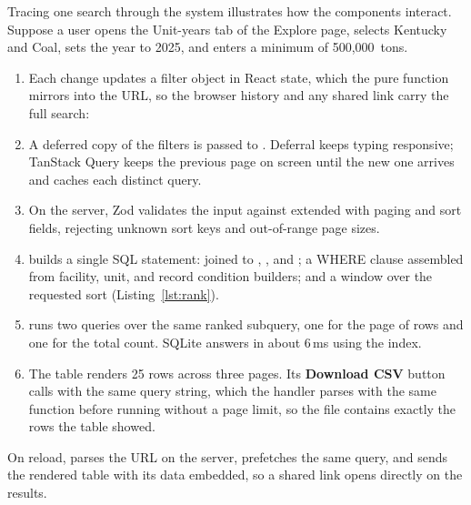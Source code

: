 \documentclass[11pt,a4paper]{article}
\begin{document}
Tracing one search through the system illustrates how the components interact. Suppose a user
opens the Unit-years tab of the Explore page, selects Kentucky and Coal, sets the year to 2025, and enters a minimum
\COtwo{} of 500{,}000~tons.

\begin{enumerate}
  \item Each change updates a filter object in React state, which the pure function
         mirrors into the URL, so the browser history and any shared
        link carry the full search:\\[2pt]
        {\small{}}
  \item A deferred copy of the filters is passed to .
        Deferral keeps typing responsive; TanStack Query keeps the previous page on screen
        until the new one arrives and caches each distinct query.
  \item On the server, Zod validates the input against  extended
        with paging and sort fields, rejecting unknown sort keys and out-of-range page sizes.
  \item {} builds a single SQL statement:  joined to
        , , and ; a WHERE clause assembled from
        facility, unit, and record condition builders; and a  window over
        the requested sort (Listing~\ref{lst:rank}).
  \item {} runs two queries over the same ranked subquery, one for the page of rows
        and one for the total count. SQLite answers in about 6\,ms using the
         index.
  \item The table renders 25 rows across three pages. Its \textbf{Download CSV} button calls
         with the same query string, which the handler
        parses with the same  function before running
         without a page limit, so the file contains exactly the rows the
        table showed.
\end{enumerate}

On reload,  parses the URL on the server, prefetches the same query, and sends
the rendered table with its data embedded, so a shared link opens directly on the results.
\end{document}
